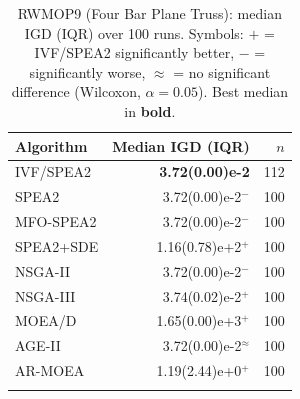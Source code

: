 \begin{table}[t]
\caption{RWMOP9 (Four Bar Plane Truss): median IGD (IQR) over 100 runs. Symbols: $+$ = IVF/SPEA2 significantly better, $-$ = significantly worse, $\approx$ = no significant difference (Wilcoxon, $\alpha=0.05$). Best median in \textbf{bold}.}
\label{tab:engineering}
\centering\scriptsize
\begin{tabular}{lr@{\hskip 4pt}r}
\toprule
Algorithm & Median IGD (IQR) & $n$ \\
\midrule
IVF/SPEA2 & \textbf{3.72(0.00)e-2} & 112 \\
SPEA2 & 3.72(0.00)e-2$^{-}$ & 100 \\
MFO-SPEA2 & 3.72(0.00)e-2$^{-}$ & 100 \\
SPEA2+SDE & 1.16(0.78)e+2$^{+}$ & 100 \\
NSGA-II & 3.72(0.00)e-2$^{-}$ & 100 \\
NSGA-III & 3.74(0.02)e-2$^{+}$ & 100 \\
MOEA/D & 1.65(0.00)e+3$^{+}$ & 100 \\
AGE-II & 3.72(0.00)e-2$^{\approx}$ & 100 \\
AR-MOEA & 1.19(2.44)e+0$^{+}$ & 100 \\
\botrule
\end{tabular}
\end{table}